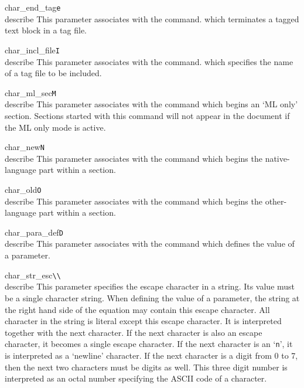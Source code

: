 \begin{describepara}{char_end_tag}{\verb*|e|}\\describe
This parameter associates with the  command.
which terminates a tagged text block in a tag file.
\end{describepara}
\begin{describepara}{char_incl_file}{\verb*|I|}\\describe
This parameter associates with the  command.
which specifies the name of a tag file to be included.
\end{describepara}
\begin{describepara}{char_ml_sec}{\verb*|M|}\\describe
This parameter associates with the  command
which begins an `ML only' section. Sections started with this command
will not appear in the document if the ML only mode is active.
\end{describepara}
\begin{describepara}{char_new}{\verb*|N|}\\describe
This parameter associates with the  command
which begins the native-language part within a section. 
\end{describepara}
\begin{describepara}{char_old}{\verb*|O|}\\describe
This parameter associates with the  command
which begins the other-language part within a section. 
\end{describepara}
\begin{describepara}{char_para_def}{\verb*|D|}\\describe
This parameter associates with the  command
which defines the value of a parameter.
\end{describepara}
\begin{describepara}{char_str_esc}{\verb*|\\|}\\describe
This parameter specifies the escape character in a string. Its value must
be a single character string. When defining the value of a parameter,
the string at the right hand side of the equation may contain this
escape character. All character in the string is literal except this
escape character. It is interpreted together with the next character.
If the next character is also an escape character, it becomes a single
escape character. If the next character is an `{\tt n}', it is
interpreted as a `newline' character. If the next character is a digit
from 0 to 7, then the next two characters must be digits as well. This
three digit number is interpreted as an octal number specifying the
ASCII code of a character.
\end{describepara}
